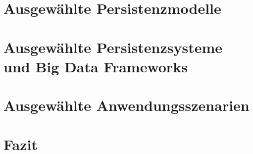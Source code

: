 \documentclass[12pt, bibliography=totoc, a4paper, abstractoff, numbers=noenddot]{scrreprt}
\begin{document}


%



\tableofcontents\newpage



\chapter{Ausgewählte Persistenzmodelle}

\chapter{Ausgewählte Persistenzsysteme und Big Data Frameworks}

\chapter{Ausgewählte Anwendungsszenarien}


\chapter{Fazit}

%

%


\newpage



% 


%



%
\end{document}
